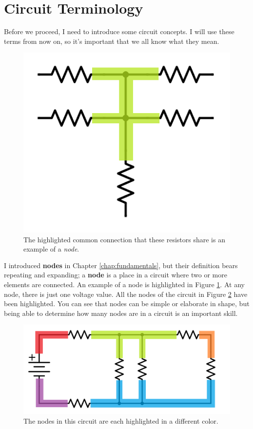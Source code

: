 \section{Circuit Terminology}
Before we proceed, I need to introduce some circuit concepts. I will use these terms from now on, so it's important that we all know what they mean.
\begin{figure}[h!]
\centering
\includegraphics[width=13cm]{figures/nodeCloseUp.png}
\caption{The highlighted common connection that these resistors share is an example of a \textit{node}.}
\label{nodeCloseUp}
\end{figure}
\par
I introduced \textbf{nodes} in Chapter \ref{chap:fundamentals}, but their definition bears repeating and expanding; a \textbf{node} is a place in a circuit where two or more elements are connected. An example of a node is highlighted in Figure \ref{nodeCloseUp}. At any node, there is just one voltage value. All the nodes of the circuit in Figure \ref{nodesHighlighted} have been highlighted. You can see that nodes can be simple or elaborate in shape, but being able to determine how many nodes are in a circuit is an important skill.
\begin{figure}[h!]
\centering
\includegraphics[width=13cm]{figures/nodesHighlighted.png}
\caption{The nodes in this circuit are each highlighted in a different color.}
\label{nodesHighlighted}
\end{figure}

